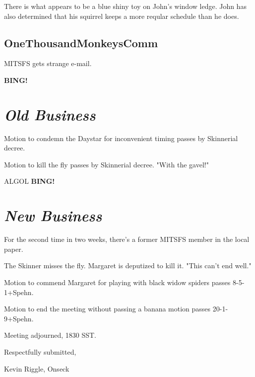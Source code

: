 \documentclass[10pt]{article}
\newcommand{\bing}{{\bf BING!} }
\newcommand{\goto}[1]{\bing \vskip 12pt \section*{{\em{#1}}}}
\begin{document}
There is what appears to be a blue shiny toy on John's window ledge.  John has also determined that his squirrel keeps
a more reqular schedule than he does.

\subsection*{OneThousandMonkeysComm}

MITSFS gets strange e-mail.

\goto{Old Business}

Motion to condemn the Daystar for inconvenient timing passes by Skinnerial decree.

Motion to kill the fly passes by Skinnerial decree.  "With the gavel!"

ALGOL
\goto{New Business}

For the second time in two weeks, there's a former MITSFS member in the local paper.

The Skinner misses the fly.  Margaret is deputized to kill it.  "This can't end well."

Motion to commend Margaret for playing with black widow spiders passes 8-5-1+Spehn.

Motion to end the meeting without passing a banana motion passes 20-1-9+Spehn.

\vspace{12pt}

\noindent
Meeting adjourned, 1830 SST.

\vspace{18pt}

\centerline{Respectfully submitted,}
\centerline{Kevin Riggle, Onseck}
\end{document}
